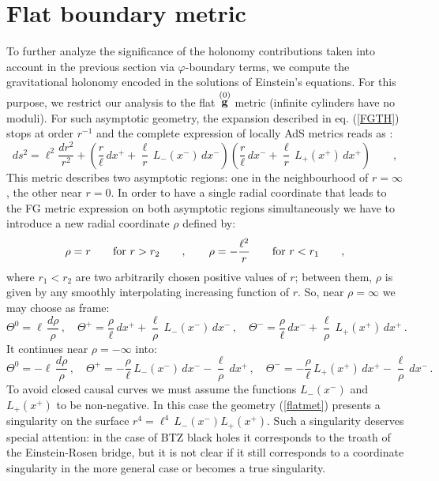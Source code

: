 \documentclass[a4paper,10pt]{article}
\begin{document}
\section{Flat boundary metric}

To further analyze the significance of the holonomy contributions taken 
into account in the previous section via $\varphi$-boundary terms, we compute 
the gravitational holonomy encoded in the solutions of Einstein's equations. 
For this purpose, we restrict 
our analysis to the flat $\stackrel {(0)} {\bf g}$ metric (infinite cylinders
have no moduli). For such asymptotic geometry, 
the expansion described in
eq. (\ref{FGTH}) stops at order $r^{-1}$
and the complete expression of locally AdS metrics reads as \cite{BAN}:
\begin{equation}
\label{flatmet}
ds^2 = \ell^2 \frac {dr^2} {r^2} +\left( \frac r \ell\, d x^{+} + 
  \frac \ell r \, L_-(x^-) \, d x^-\right)\left(
\frac r \ell \, d x^{-} + 
     \frac \ell r \, L_+(x^+) \, d x^+ \right)
\qquad ,
\end{equation}
This metric describes two asymptotic regions: one in the neighbourhood of
$r=\infty$, the other near $r=0$. In order to have a single radial coordinate
that leads to the FG metric expression on both asymptotic
regions simultaneously we have to introduce a new radial 
coordinate $\rho$ defined by:
\begin{equation}
\rho=r\qquad \mbox{\rm for}\ r>r_2 \qquad , \qquad
\rho=-\frac{\ell^2}r \qquad \mbox{\rm for}\ r<r_1 \qquad ,
\end{equation}
where $r_1<r_2$ are two arbitrarily chosen positive values of $r$; between
them, $\rho$ is given by any smoothly interpolating increasing function of
$r$. So, near $\rho=\infty$ we may choose as frame:
\begin{equation}
\Theta^0=\ell\,\frac {d\rho}{\rho}\, ,\quad \Theta^+=\frac \rho\ell \,dx^+ +
\frac\ell\rho \,L_-(x^-)\, dx^-\, ,\quad  \Theta^-=\frac \rho\ell \,dx^- +
\frac\ell\rho \,L_+(x^+)\, dx^+\, .
\end{equation}
It continues near $\rho=-\infty$ into:
\begin{equation}
\Theta^0=-\ell\,\frac {d\rho}{\rho} \, ,\quad 
\Theta^+=-\frac\rho\ell\,L_-(x^-)\, dx^- -\frac \ell\rho \,dx^+  \, ,\quad 
 \Theta^-=-
\frac\rho\ell\,L_+(x^+)\, dx^+ - \frac \ell\rho \,dx^- \,.
\end{equation}
To avoid closed causal curves we must assume the functions
$L_-(x^-)$ and $L_+(x^+)$ to be non-negative. In this case the geometry
(\ref{flatmet}) presents a singularity on the surface $r^4=\ell^4\, L_-(x^-)
L_+(x^+)$. Such a singularity deserves special attention: in the 
case of BTZ black
holes it corresponds to the troath of the Einstein-Rosen bridge, but it is not
clear if it still corresponds to a coordinate singularity in
the more general case or becomes a true singularity.
\end{document}

